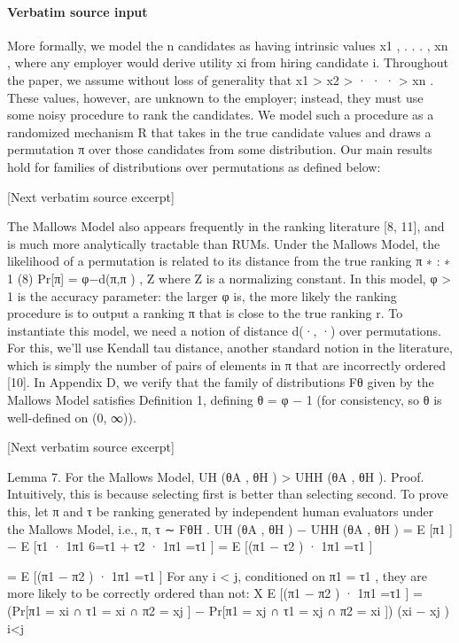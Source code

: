 \documentclass[10pt]{article}
\begin{document}
\paragraph{Verbatim source input}
\begin{ReviewVerbatim}
More formally, we model the n candidates as having intrinsic values x1 , . . . , xn , where any employer would
derive utility xi from hiring candidate i. Throughout the paper, we assume without loss of generality that
x1 > x2 > · · · > xn . These values, however, are unknown to the employer; instead, they must use some
noisy procedure to rank the candidates. We model such a procedure as a randomized mechanism R that
takes in the true candidate values and draws a permutation π over those candidates from some distribution.
Our main results hold for families of distributions over permutations as defined below:

[Next verbatim source excerpt]

The Mallows Model also appears frequently in the ranking literature [8, 11], and is much more analytically
tractable than RUMs. Under the Mallows Model, the likelihood of a permutation is related to its distance
from the true ranking π ∗ :
∗
1
(8)
Pr[π] = φ−d(π,π ) ,
Z
where Z is a normalizing constant. In this model, φ > 1 is the accuracy parameter: the larger φ is, the
more likely the ranking procedure is to output a ranking π that is close to the true ranking r. To instantiate
this model, we need a notion of distance d(·, ·) over permutations. For this, we’ll use Kendall tau distance,
another standard notion in the literature, which is simply the number of pairs of elements in π that are
incorrectly ordered [10]. In Appendix D, we verify that the family of distributions Fθ given by the Mallows
Model satisfies Definition 1, defining θ = φ − 1 (for consistency, so θ is well-defined on (0, ∞)).

[Next verbatim source excerpt]

Lemma 7. For the Mallows Model, UH (θA , θH ) > UHH (θA , θH ).
Proof. Intuitively, this is because selecting first is better than selecting second. To prove this, let π and τ
be ranking generated by independent human evaluators under the Mallows Model, i.e., π, τ ∼ FθH .
UH (θA , θH ) − UHH (θA , θH ) = E [π1 ] − E [τ1 · 1π1 6=τ1 + τ2 · 1π1 =τ1 ]
= E [(π1 − τ2 ) · 1π1 =τ1 ]

= E [(π1 − π2 ) · 1π1 =τ1 ]
For any i < j, conditioned on π1 = τ1 , they are more likely to be correctly ordered than not:
X
E [(π1 − π2 ) · 1π1 =τ1 ] =
(Pr[π1 = xi ∩ τ1 = xi ∩ π2 = xj ] − Pr[π1 = xj ∩ τ1 = xj ∩ π2 = xi ]) (xi − xj )
i<j


\end{ReviewVerbatim}
\end{document}
